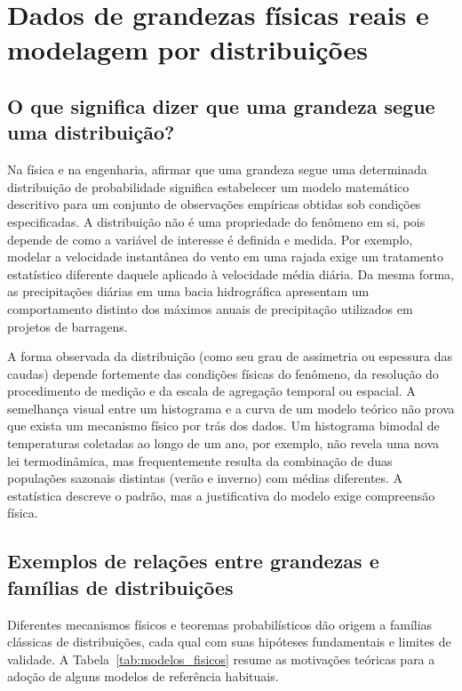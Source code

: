 \section{Dados de grandezas físicas reais e modelagem por distribuições}\label{sec:dados}

\subsection{O que significa dizer que uma grandeza segue uma distribuição?}

Na física e na engenharia, afirmar que uma grandeza segue uma determinada distribuição de probabilidade significa estabelecer um modelo matemático descritivo para um conjunto de observações empíricas obtidas sob condições especificadas. A distribuição não é uma propriedade do fenômeno em si, pois depende de como a variável de interesse é definida e medida. Por exemplo, modelar a velocidade instantânea do vento em uma rajada exige um tratamento estatístico diferente daquele aplicado à velocidade média diária. Da mesma forma, as precipitações diárias em uma bacia hidrográfica apresentam um comportamento distinto dos máximos anuais de precipitação utilizados em projetos de barragens.

A forma observada da distribuição (como seu grau de assimetria ou espessura das caudas) depende fortemente das condições físicas do fenômeno, da resolução do procedimento de medição e da escala de agregação temporal ou espacial. A semelhança visual entre um histograma e a curva de um modelo teórico não prova que exista um mecanismo físico por trás dos dados. Um histograma bimodal de temperaturas coletadas ao longo de um ano, por exemplo, não revela uma nova lei termodinâmica, mas frequentemente resulta da combinação de duas populações sazonais distintas (verão e inverno) com médias diferentes. A estatística descreve o padrão, mas a justificativa do modelo exige compreensão física.

\subsection{Exemplos de relações entre grandezas e famílias de distribuições}

Diferentes mecanismos físicos e teoremas probabilísticos dão origem a famílias clássicas de distribuições, cada qual com suas hipóteses fundamentais e limites de validade. A Tabela~\ref{tab:modelos_fisicos} resume as motivações teóricas para a adoção de alguns modelos de referência habituais.

